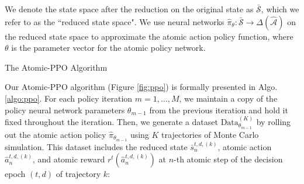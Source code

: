 We denote the state space after the reduction on the original state as $\bar{\mathcal{S}}$, which we refer to as the ``reduced state space". 
We use neural networks $\hat{\pi}_{\theta}: \bar{\mathcal{S}} \rightarrow \Delta(\hat{\mathcal{A}})$ on the reduced state space to approximate the atomic action policy function, where $\theta$ is the parameter vector for the atomic policy network. 
\begin{algorithm}[h]
    \SetAlgoLined
    \caption{The Atomic-PPO Algorithm} \label{algo:ppo}
\end{algorithm}
Our Atomic-PPO algorithm (Figure \ref{fig:ppo}) is formally presented in Algo. \ref{algo:ppo}. For each policy iteration $m = 1, \dots, M$, we maintain a copy of the policy neural network parameters $\theta_{m-1}$ from the previous iteration and hold it fixed throughout the iteration. Then, we generate a dataset $\mathrm{Data}^{(K)}_{\theta_{m-1}}$ by rolling out the atomic action policy $\hat{\pi}_{\theta_{m-1}}$ using $K$ trajectories of Monte Carlo simulation. This dataset includes the reduced state $\bar{s}^{t,d, (k)}_{n}$, atomic action $\hat{a}^{t,d, (k)}_{n}$, and atomic reward $r^t(\hat{a}^{t,d, (k)}_{n})$ at $n$-th atomic step of the decision epoch $(t, d)$ of trajectory $k$:
